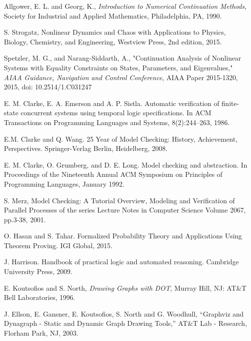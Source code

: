 \documentclass[12pt]{article}
\begin{document}
\begin{thebibliography}{9}

Allgower, E. L. and Georg, K., {\it Introduction to Numerical Continuation Methods}, Society for Industrial and Applied Mathematics, Philadelphia, PA, 1990.

S. Strogatz, Nonlinear Dynamics and Chaos with Applications to Physics, Biology, Chemistry, and Engineering, Westview Press, 2nd edition, 2015.

Spetzler, M. G., and Narang-Siddarth, A., "Continuation Analysis of Nonlinear Systems with Equality Constraints on States, Parameters, and Eigenvalues," {\it AIAA Guidance, Navigation and Control Conference}, AIAA Paper 2015-1320, 2015, doi: 10.2514/1.C031247

E. M. Clarke, E. A. Emerson and A. P. Sistla. Automatic verification of finite-state concurrent systems using temporal logic specifications. In ACM Transactions on Programming Languages and Systems, 8(2):244--263, 1986.

E.M. Clarke and Q. Wang. 25 Year of Model Checking: History, Achievement, Perspectives. Springer-Verlag Berlin, Heidelberg, 2008.

E. M. Clarke, O. Grumberg, and D. E. Long. Model checking and abstraction. In Proceedings of the Nineteenth Annual ACM Symposium on Principles of Programming Languages, January 1992.

S. Merz, Model Checking: A Tutorial Overview, Modeling and Verification of Parallel Processes of the series Lecture Notes in Computer Science Volume 2067, pp.3-38, 2001.

O. Hasan and S. Tahar. Formalized Probability Theory and Applications Using Theorem Proving. IGI Global, 2015.

J. Harrison. Handbook of practical logic and automated reasoning. Cambridge University Press, 2009.

E. Koutsofios and S. North, \textit{Drawing Graphs with DOT}, Murray Hill, NJ: AT\&T Bell Laboratories, 1996. 

J. Ellson, E. Gansner, E. Koutsofios, S. North and G. Woodhull, ``Graphviz and Dynagraph - Static and Dynamic Graph Drawing Tools,'' AT\&T Lab - Research, Florham Park, NJ, 2003.

\end{thebibliography}
\end{document}
